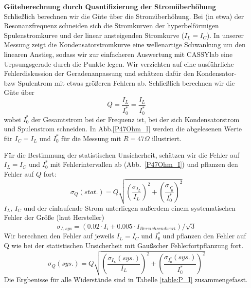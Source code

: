 \documentclass[12pt,a4paper]{article}
\begin{document}
\textbf{Güteberechnung durch Quantifizierung der Stromüberhöhung}\\
Schließlich berechnen wir die Güte über die Stromüberhöhung. Bei (in etwa) der Resonanzfrequenz schneiden sich die Stromkurven der hyperbelförmigen Spulenstromkurve und der linear ansteigenden Stromkurve ($I_L=I_C$). In unserer Messung zeigt die Kondensatorstromkurve eine wellenartige Schwankung um den linearen Anstieg, sodass wir zur einfacheren Auswertung mit CASSYlab eine Urpsungsgerade durch die Punkte legen.  Wir verzichten auf eine ausführliche Fehlerdiskussion der Geradenanpassung und schätzen dafür den Kondensator- bzw Spulentrom mit etwas größeren Fehlern ab. Schließlich berechnen wir die Güte über 
\begin{equation}
Q=\frac{I_L}{I_0^*}=\frac{I_L}{I_0^*}
\end{equation}
wobei $I_0^*$ der Gesamtstrom bei der Frequenz ist, bei der sich Kondensatorstrom und Spulenstrom schneiden. In Abb.\ref{P47Ohm_I} werden die abgelesenen Werte für $I_C=I_L$ und $I_0^*$ für die Messung mit $R=47\Omega$ illustriert.

Für die Bestimmung der statistischen Unsicherheit, schätzen wir die Fehler auf $I_L=I_C$ und $I_0^*$ mit Fehlerintervallen ab (Abb.~\ref{P47Ohm_I}) und pflanzen den Fehler auf $Q$ fort:
\begin{equation}
\sigma_Q(stat.)=Q\sqrt{\left(\frac{\sigma_{I_L}}{I_L}\right)^2+\left(\frac{\sigma_{I_0^*}}{I_0^*}\right)^2}
\end{equation}
$I_L$, $I_C$ und der einlaufende Strom unterliegen außerdem einem systematischen Fehler der Größe (laut Hersteller)
\begin{equation}
\sigma_{I,sys}=(0.02\cdot I_i+0.005\cdot I_{Bereichsendwert})/\sqrt{3}
\end{equation}
Wir berechnen den Fehler auf jeweils $I_L=I_C$ und $I_0^*$ und pflanzen den Fehler auf Q wie bei der statistischen Unsicherheit mit Gaußscher Fehlerfortpflanzung fort.
\begin{equation}
\sigma_Q(sys.)=Q\sqrt{\left(\frac{\sigma_{I_L}(sys.)}{I_L}\right)^2+\left(\frac{\sigma_{I_0^*}(sys.)}{I_0^*}\right)^2}
\end{equation}
Die Ergbenisse für alle Widerstände sind in Tabelle \ref{table:P_I} zusammengefasst.
\end{document}
